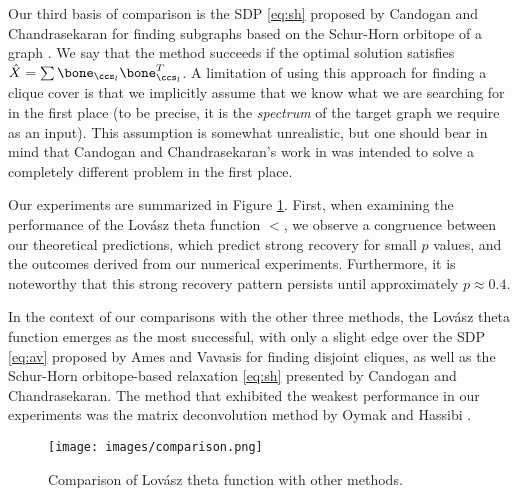 Our third basis of comparison is the SDP \eqref{eq:sh} proposed by Candogan and Chandrasekaran for finding subgraphs based on the Schur-Horn orbitope of a graph \cite{CC:18}.  We say that the method succeeds if the optimal solution satisfies $\hat{X} = \sum \bone_{\ccs_l}\bone_{\ccs_l}^T$. A limitation of using this  
approach  for finding a clique cover is that we  implicitly assume that we know what we are searching for in the first place (to be precise, it is the {\em spectrum} of the target graph we require as an input).  This assumption is somewhat unrealistic, but one should bear in mind that Candogan and Chandrasekaran's work in \cite{CC:18} was intended to solve a completely different problem in the first place.


Our experiments are summarized in Figure \ref{fig:comparison}. First, when examining the performance of the Lovász theta function $\lt$, we observe a congruence between our theoretical predictions, which predict  strong recovery for small $p$ values, and the outcomes derived from our numerical experiments. Furthermore, it is noteworthy that this strong recovery pattern persists  until approximately $p\approx 0.4$.

In the context of our comparisons with the other three methods, the Lovász theta function emerges as the most successful,  with only a slight edge over the SDP \eqref{eq:av} proposed by Ames and Vavasis \cite{AV:14} for finding disjoint cliques, as well as the Schur-Horn orbitope-based relaxation \eqref{eq:sh} presented by Candogan and Chandrasekaran. The method that exhibited the weakest performance in our experiments was the matrix deconvolution method by Oymak and Hassibi \cite{OH:11}.
%

\begin{figure}[H]
\centering
\texttt{[image: images/comparison.png]}
\caption{Comparison of Lov\'asz theta function with other methods.}
\label{fig:comparison}
\end{figure}





